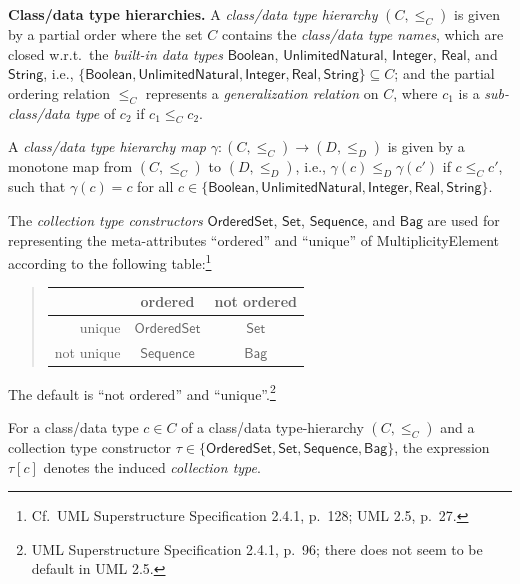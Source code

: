 \documentclass[10pt,fleqn,final]{scrreprt}
\newcommand{\cbs}[0]{\color{red}\xspace} %
\newcommand{\cbe}[0]{\color{black}\xspace} %
\newenvironment{definitions}[0]{\medskip }{}
\newcommand{\uml}[1]{\textsf{#1}}
\begin{document}
\begin{definitions}
\medskip\noindent\textbf{Class/data type hierarchies.}  A
\emph{class/data type hierarchy} $(C, {\leq_C})$ is given by a partial
order where the set $C$ contains the \emph{class/data type names}, which
are closed w.r.t.\ the \emph{built-in data types} $\mathsf{Boolean}$,
$\mathsf{UnlimitedNatural}$, $\mathsf{Integer}$, $\mathsf{Real}$, and
$\mathsf{String}$, i.e.,
$\{ \mathsf{Boolean}, \mathsf{UnlimitedNatural},\allowbreak
\mathsf{Integer}, \mathsf{Real}, \mathsf{String} \} \subseteq
C$;
and the partial ordering relation $\leq_C$ represents a
\emph{generalization relation} on $C$, where $c_1$ is a
\emph{sub-class/data type} of $c_2$ if $c_1 \leq_C c_2$.

A \emph{class/data type hierarchy map}
$\gamma : (C, {\leq_C}) \to (D, {\leq_D})$ is given by a monotone map
from $(C, {\leq_C})$ to $(D, {\leq_D})$, i.e.,
$\gamma(c) \leq_D \gamma(c')$ if $c \leq_C c'$, such that
$\gamma(c) = c$ for all
$c \in \{ \mathsf{Boolean},\allowbreak \mathsf{UnlimitedNatural},\allowbreak
\mathsf{Integer}, \mathsf{Real}, \mathsf{String} \}$.

\medskip
\cbs The \emph{collection type constructors} $\mathsf{OrderedSet}$,
$\mathsf{Set}$, $\mathsf{Sequence}$, and $\mathsf{Bag}$ are used\cbe for
representing the meta-attributes ``ordered'' and ``unique'' of
\uml{MultiplicityElement} according to the following
table:\footnote{Cf.~UML Superstructure Specification 2.4.1, p.~128; UML
  2.5, p.~27.}
%
\begin{quotation}
\begin{tabular}{@{}r||c|c@{}}
             & ordered               & not ordered\\
\hline\hline
  unique     & $\mathsf{OrderedSet}$ & $\mathsf{Set}$\\
\hline
  not unique & $\mathsf{Sequence}$   & $\mathsf{Bag}$
\end{tabular}
\end{quotation}
%
The default is ``not ordered'' and ``unique''.\footnote{UML
  Superstructure Specification 2.4.1, p.~96; there does not seem to be
  default in UML 2.5.}

For a class/data type $c \in C$ of a class/data type-hierarchy
$(C, {\leq_C})$ and a collection type constructor
$\tau \in \{ \mathsf{OrderedSet}, \mathsf{Set}, \mathsf{Sequence},
\mathsf{Bag} \}$,\cbs
 the expression $\tau[c]$ denotes the induced \emph{collection type}.\cbe


\end{definitions}
\end{document}
